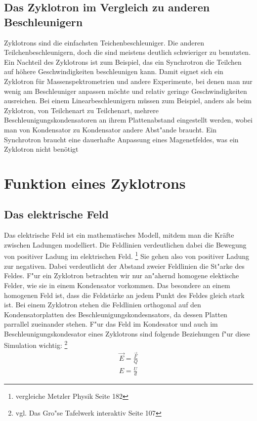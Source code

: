 \documentclass[14pt, a4paper]{report}
\begin{document}
\section{Das Zyklotron im Vergleich zu anderen Beschleunigern}
Zyklotrons sind die einfachsten Teichenbeschleuniger. Die anderen 
Teilchenbeschleunigern, doch die sind meistens deutlich schwieriger zu benutzten. 
Ein Nachteil des Zyklotrons ist zum Beispiel, das ein Synchrotron die Teilchen auf 
höhere Geschwindigkeiten beschleunigen kann. Damit eignet sich ein Zyklotron für 
Massenspektrometrien und andere Experimente, bei denen man nur wenig am 
Beschleuniger anpassen möchte und relativ geringe Geschwindigkeiten ausreichen. 
Bei einem Linearbeschleunigern müssen zum Beispiel, anders als beim Zyklotron, von 
Teilchenart zu Teilchenart, mehrere Beschleunigungskondensatoren an ihrem 
Plattenabstand eingestellt werden, wobei man von Kondensator zu Kondensator andere
Abst"ande braucht. Ein Synchrotron braucht eine dauerhafte Anpassung eines 
Magenetfeldes, was ein Zyklotron nicht benötigt

\chapter{Funktion eines Zyklotrons}
\section{Das elektrische Feld}
Das elektrische Feld ist ein mathematisches Modell, mitdem man die Kräfte zwischen
Ladungen modelliert. Die Feldlinien verdeutlichen dabei die Bewegung von positiver 
Ladung im elektrischen Feld. \footnote{vergleiche Metzler Physik Seite 182}
Sie gehen also von positiver Ladung zur negativen. Dabei verdeutlicht der Abstand zweier
Feldlinien die St"arke des Feldes. F"ur ein Zyklotron betrachten wir nur an"ahernd
homogene elektische Felder, wie sie in einem Kondensator vorkommen. Das besondere an 
einem homogenen Feld ist, dass die Feldstärke an jedem Punkt des Feldes gleich stark 
ist. Bei einem Zyklotron stehen die Feldlinien orthogonal auf den Kondensatorplatten
des Beschleunigungskondesnsators, da dessen Platten parrallel zueinander stehen.
F"ur das Feld im Kondesator und auch im Beschleunigungskondesator eines Zyklotrons
sind folgende Beziehungen f"ur diese Simulation wichtig:
\footnote{vgl. Das Gro"se Tafelwerk interaktiv Seite 107}
\begin{eqnarray}
\vec{E} = \frac{\vec{F}}{Q} \\
E = \frac{U}{d}
\end{eqnarray}
\end{document}
